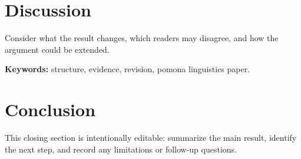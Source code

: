 \documentclass[11pt]{article}
\begin{document}
\section{Discussion}
Consider what the result changes, which readers may disagree, and how the argument could be extended.\par\medskip
\noindent\textbf{Keywords:} structure, evidence, revision, pomona linguistics paper.

\section{Conclusion}
This closing section is intentionally editable: summarize the main result, identify the next step, and record any limitations or follow-up questions.
\end{document}
